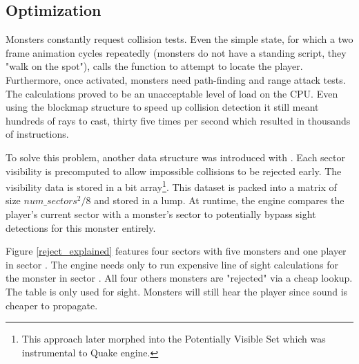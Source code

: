 \subsection{Optimization}
Monsters constantly request collision tests. Even the simple  state, for which a two frame animation cycles repeatedly (monsters do not have a standing script, they "walk on the spot"), calls the  function to attempt to locate the player. Furthermore, once activated, monsters need path-finding and range attack tests. The calculations proved to be an unacceptable level of load on the CPU. Even using the blockmap structure to speed up collision detection it still meant hundreds of rays to cast, thirty five times per second which resulted in thousands of instructions.\\
\par
To solve this problem, another data structure was introduced with . Each sector visibility is precomputed to allow impossible collisions to be rejected early. The visibility data is stored in a bit array\footnote{This approach later morphed into the Potentially Visible Set which was instrumental to Quake engine.}. This dataset is packed into a matrix of size $num\_sectors^2/8$ and stored in a  lump. At runtime, the engine compares the player's current sector with a monster's sector to potentially bypass sight detections for this monster entirely.\\
\par
{}
\vspace{-7pt}
Figure \ref{reject_explained} features four sectors with five monsters and one player in sector . The engine needs only to run expensive line of sight calculations for the monster in sector . All four others monsters are "rejected" via a cheap lookup. The table is only used for sight. Monsters will still hear the player since sound is cheaper to propagate.\\
\par
{}






